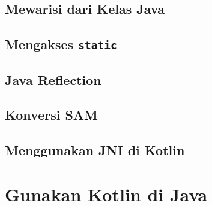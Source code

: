 \subsection{Mewarisi dari Kelas Java}

\subsection{Mengakses \texttt{static}}

\subsection{Java Reflection}

\subsection{Konversi SAM}

\subsection{Menggunakan JNI di Kotlin}

\section{Gunakan Kotlin di Java}
